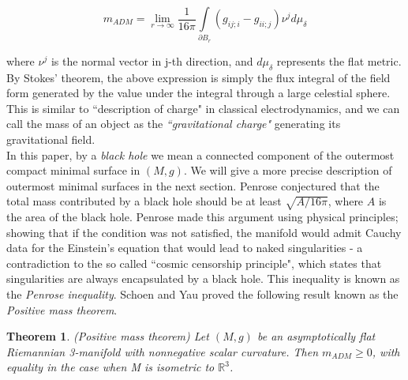 \documentclass{amsart}
\newtheorem{theorem}{Theorem}
\theoremstyle{named}
\begin{document}
\begin{equation} \nonumber
    m_{ADM} = \lim_{r \rightarrow \infty} \frac{1}{16\pi}\int\limits_{\partial B_r} (g_{ij;i} - g_{ii;j})\nu^{j} d\mu_{\delta}
\end{equation}

where $\nu^j$ is the normal vector in j-th direction, and $d\mu_{\delta}$ represents the flat metric. \\

By Stokes' theorem, the above expression is simply the flux integral of the field form generated by the value under the integral through a large celestial sphere. This is similar to ``description of charge" in classical electrodynamics, and we can call the mass of an object as the \textit{``gravitational charge"} generating its gravitational field. \\

In this paper, by a \textit{black hole} we mean a connected component of the outermost compact minimal surface in $(M,g)$. We will give a more precise description of outermost minimal surfaces in the next section. Penrose \cite{Penrose:1969pc} conjectured that the total mass contributed by a black hole should be at least $\sqrt{A/16\pi}$, where $A$ is the area of the black hole. Penrose made this argument using physical principles; showing that if the condition was not satisfied, the manifold would admit Cauchy data for the Einstein's equation that would lead to naked singularities - a contradiction to the so called ``cosmic censorship principle", which states that singularities are always encapsulated by a black hole. This inequality is known as the \textit{Penrose inequality}. Schoen and Yau \cite{schoenyau1, schoenyau2} proved the following result known as the \textit{Positive mass theorem}.\\

\begin{theorem} (Positive mass theorem)
    Let $(M,g)$ be an asymptotically flat Riemannian 3-manifold with nonnegative scalar curvature. Then $m_{ADM} \geq 0$, with equality in the case when M is isometric to $\mathbb{R}^3$.
\end{theorem}
\end{document}
